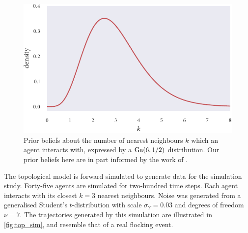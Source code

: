 \begin{figure}[tbp]
  \includegraphics{top_priors.pdf}
  \caption{Prior beliefs about the number of nearest neighbours $k$ which an
    agent interacts with, expressed by a $\textrm{Ga}(6, 1/2)$ distribution. Our prior
    beliefs here are in part informed by the work of \textcite{ballerini08}.}
  \label{fig:top_priors}
\end{figure}

The topological model is forward simulated to generate data for the simulation
study. Forty-five agents are simulated for two-hundred time steps. Each agent
interacts with its closest $k=3$ nearest neighbours. Noise was generated from a
generalised Student's $t$-distribution with scale $\sigma_Y=0.03$ and degrees
of freedom $\nu=7$. The trajectories generated by this simulation are
illustrated in \cref{fig:top_sim}, and resemble that of a real flocking event.

